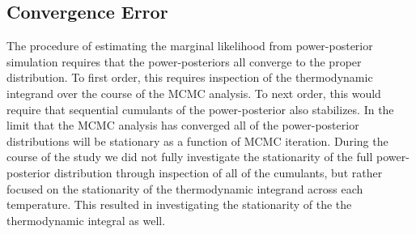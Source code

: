 \subsection{Convergence Error}
The procedure of estimating the marginal likelihood from power-posterior simulation requires that the power-posteriors all converge to the proper distribution. To first order, this requires inspection of the thermodynamic integrand over the course of the MCMC analysis. To next order, this would require that sequential cumulants of the power-posterior also stabilizes. In the limit that the MCMC analysis has converged all of the power-posterior distributions will be stationary as a function of MCMC iteration. During the course of the study we did not fully investigate the stationarity of the full power-posterior distribution through inspection of all of the cumulants, but rather focused on the stationarity of the thermodynamic integrand across each temperature. This resulted in investigating the stationarity of the the thermodynamic integral as well.

